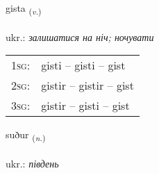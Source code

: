\documentclass[frontgrid, backgrid]{flacards}\usepackage[]{graphicx}\usepackage[]{xcolor}
\begin{document}
\renewcommand{\flhead}{\vskip5pt \fboxsep=0pt {\small\bfseries\footnotesize Sagnorð | дієслово}}
\renewcommand{\fcfoot}{\vskip5pt \fboxsep=0pt \hspace{2pt}{\small\bfseries\footnotesize 3K}}

\renewcommand{\blhead}{\vskip5pt {\small\bfseries\footnotesize Sagnorð | дієслово }}
\renewcommand{\bcfoot}{\vskip5pt \hspace{2pt}{\small\bfseries\footnotesize 3K}}


{gista \small{\textsubscript{(\textit{v.})}} \\[1ex] %
\textphonetic{[cɪsta]} \\
ukr.: \emph{залишатися на ніч; ночувати} \\  [2ex]
\renewcommand*{\arraystretch}{0.8}
\begin{tabular}{p{1cm}l}
\textsc{1sg}: & gisti -- gisti -- gist \\ 
\textsc{2sg}: & gistir -- gistir -- gist \\ 
\textsc{3sg}: & gistir -- gisti -- gist \\ 
\end{tabular}
}

\renewcommand{\flhead}{\vskip5pt \fboxsep=0pt {\small\bfseries\footnotesize Nafnorð | іменник}}
\renewcommand{\fcfoot}{\vskip5pt \fboxsep=0pt \hspace{2pt}{\small\bfseries\footnotesize 3K}}

\renewcommand{\blhead}{\vskip5pt {\small\bfseries\footnotesize Nafnorð | іменник }}
\renewcommand{\bcfoot}{\vskip5pt \hspace{2pt}{\small\bfseries\footnotesize 3K}}


{suður \small{\textsubscript{(\textit{n.})}} \\[1ex] %
\textphonetic{[sʏːðʏr]} \\
ukr.: \emph{південь} \\  [2ex]
\renewcommand*{\arraystretch}{0.8}
}
\end{document}
